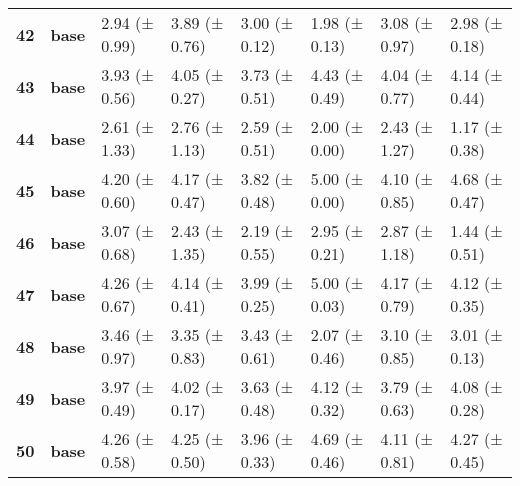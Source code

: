\begin{longtable}{llllllll}
\cline{1-8}
\textbf{42} & \textbf{base} & 2.94 (± 0.99) & 3.89 (± 0.76) & 3.00 (± 0.12) & 1.98 (± 0.13) & 3.08 (± 0.97) & 2.98 (± 0.18) \\
\cline{1-8}
\textbf{43} & \textbf{base} & 3.93 (± 0.56) & 4.05 (± 0.27) & 3.73 (± 0.51) & 4.43 (± 0.49) & 4.04 (± 0.77) & 4.14 (± 0.44) \\
\cline{1-8}
\textbf{44} & \textbf{base} & 2.61 (± 1.33) & 2.76 (± 1.13) & 2.59 (± 0.51) & 2.00 (± 0.00) & 2.43 (± 1.27) & 1.17 (± 0.38) \\
\cline{1-8}
\textbf{45} & \textbf{base} & 4.20 (± 0.60) & 4.17 (± 0.47) & 3.82 (± 0.48) & 5.00 (± 0.00) & 4.10 (± 0.85) & 4.68 (± 0.47) \\
\cline{1-8}
\textbf{46} & \textbf{base} & 3.07 (± 0.68) & 2.43 (± 1.35) & 2.19 (± 0.55) & 2.95 (± 0.21) & 2.87 (± 1.18) & 1.44 (± 0.51) \\
\cline{1-8}
\textbf{47} & \textbf{base} & 4.26 (± 0.67) & 4.14 (± 0.41) & 3.99 (± 0.25) & 5.00 (± 0.03) & 4.17 (± 0.79) & 4.12 (± 0.35) \\
\cline{1-8}
\textbf{48} & \textbf{base} & 3.46 (± 0.97) & 3.35 (± 0.83) & 3.43 (± 0.61) & 2.07 (± 0.46) & 3.10 (± 0.85) & 3.01 (± 0.13) \\
\cline{1-8}
\textbf{49} & \textbf{base} & 3.97 (± 0.49) & 4.02 (± 0.17) & 3.63 (± 0.48) & 4.12 (± 0.32) & 3.79 (± 0.63) & 4.08 (± 0.28) \\
\cline{1-8}
\textbf{50} & \textbf{base} & 4.26 (± 0.58) & 4.25 (± 0.50) & 3.96 (± 0.33) & 4.69 (± 0.46) & 4.11 (± 0.81) & 4.27 (± 0.45) \\
\cline{1-8}
\end{longtable}
